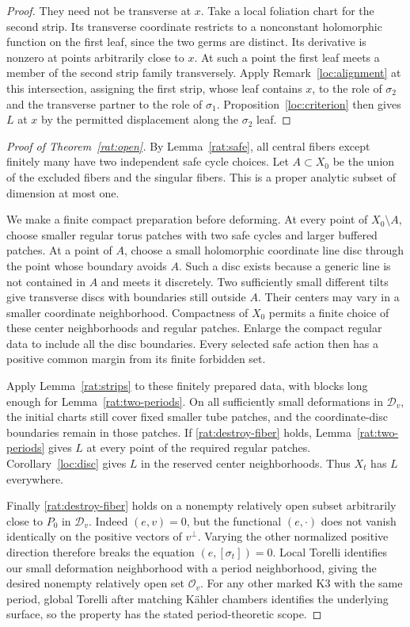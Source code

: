 \begin{proof}
They need not be transverse at $x$. Take a local foliation chart
for the second strip. Its transverse coordinate restricts to a
nonconstant holomorphic function on the first leaf, since the
two germs are distinct. Its derivative is nonzero at points
arbitrarily close to $x$. At such a point the first leaf meets
a member of the second strip family transversely. Apply
Remark~\ref{loc:alignment} at this intersection, assigning the
first strip, whose leaf contains $x$, to the role of $\sigma_2$
and the transverse partner to the role of $\sigma_1$.
Proposition~\ref{loc:criterion} then gives $L$ at $x$ by the
permitted displacement along the $\sigma_2$ leaf.
\end{proof}

\begin{proof}[Proof of Theorem~\ref{rat:open}]
By Lemma~\ref{rat:safe}, all central fibers except finitely many
have two independent safe cycle choices. Let $A\subset X_0$ be
the union of the excluded fibers and the singular fibers. This
is a proper analytic subset of dimension at most one.

We make a finite compact preparation before deforming. At every
point of $X_0\setminus A$, choose smaller regular torus patches
with two safe cycles and larger buffered patches. At a point of
$A$, choose a small holomorphic coordinate line disc through the
point whose boundary avoids $A$. Such a disc exists because a
generic line is not contained in $A$ and meets it discretely.
Two sufficiently small different tilts give transverse discs
with boundaries still outside $A$. Their centers may vary in a
smaller coordinate neighborhood. Compactness of $X_0$ permits
a finite choice of these center neighborhoods and regular
patches. Enlarge the compact regular data to include all the
disc boundaries. Every selected safe action then has a positive
common margin from its finite forbidden set.

Apply Lemma~\ref{rat:strips} to these finitely prepared data,
with blocks long enough for Lemma~\ref{rat:two-periods}.
On all sufficiently small deformations in $\mathcal D_v$, the
initial charts still cover fixed smaller tube patches, and the
coordinate-disc boundaries remain in those patches. If
\eqref{rat:destroy-fiber} holds, Lemma~\ref{rat:two-periods}
gives $L$ at every point of the required regular patches.
Corollary~\ref{loc:disc} gives $L$ in the reserved center
neighborhoods. Thus $X_t$ has $L$ everywhere.

Finally \eqref{rat:destroy-fiber} holds on a nonempty relatively
open subset arbitrarily close to $P_0$ in $\mathcal D_v$.
Indeed $(e,v)=0$, but the functional $(e,\cdot)$ does not vanish
identically on the positive vectors of $v^\perp$. Varying the
other normalized positive direction therefore breaks the
equation $(e,[\sigma_t])=0$. Local Torelli identifies our small
deformation neighborhood with a period neighborhood, giving
the desired nonempty relatively open set $\mathcal O_v$.
For any other marked K3 with the same period, global Torelli
after matching K\"ahler chambers identifies the underlying
surface, so the property has the stated period-theoretic scope.
\end{proof}
